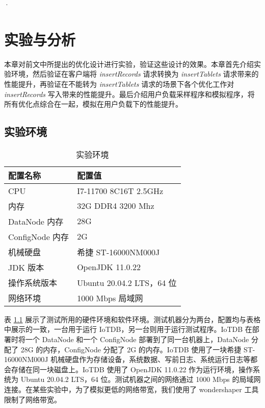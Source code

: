 ·%

\chapter{实验与分析\label{sec:chap8}}
本章对前文中所提出的优化设计进行实验，验证这些设计的效果。本章首先介绍实验环境，然后验证在客户端将 \emph{insertRecords} 请求转换为 \emph{insertTablets} 请求带来的性能提升，再验证在不能转为 \emph{insertTablets} 请求的场景下各个优化工作对 \emph{insertRecords} 写入带来的性能提升。最后介绍用户负载采样程序和模拟程序，将所有优化点综合在一起，模拟在用户负载下的性能提升。
\section{实验环境}
\begin{table}
  \centering
  \caption{实验环境}
  \begin{tabular}{ll}
    \toprule
    配置名称 & 配置值 \\
    \midrule 
    CPU & I7-11700 8C16T 2.5GHz\\
    内存 & 32G DDR4 3200 Mhz\\
    DataNode 内存 & 28G \\
    ConfigNode 内存 & 2G \\
    机械硬盘 & 希捷 ST-16000NM000J \\
    JDK 版本 & OpenJDK 11.0.22 \\
    操作系统版本 & Ubuntu 20.04.2 LTS，64 位 \\
    网络环境 & 1000 Mbps 局域网 \\
    \bottomrule
  \end{tabular}
  \label{tabular:iotdb-runtime-config}
\end{table}

表 \ref{tabular:iotdb-runtime-config} 展示了测试所用的硬件环境和软件环境。测试机器分为两台，配置均与表格中展示的一致，一台用于运行 IoTDB，另一台则用于运行测试程序。IoTDB 在部署时将一个 DataNode 和一个 ConfigNode 部署到了同一台机器上，DataNode 分配了 28G 的内存，ConfigNode 分配了 2G 的内存。IoTDB 使用了一块希捷 ST-16000NM000J 机械硬盘作为存储设备，系统数据、写前日志、系统运行日志等都会存储在同一块磁盘上。IoTDB 使用了 OpenJDK 11.0.22 作为运行环境，操作系统为 Ubuntu 20.04.2 LTS，64 位。测试机器之间的网络通过 1000 Mbps 的局域网连接。在某些实验中，为了模拟更低的网络带宽，我们使用了 wondershaper 工具限制了网络带宽。

